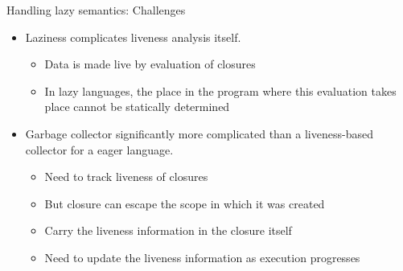 \documentclass[xcolor=x11names,compress,mathserif]{beamer}
\renewcommand{\(}{\begin{columns}}
\renewcommand{\)}{\end{columns}}
\newcommand{\<}[1]{\begin{column}{#1}}
\renewcommand{\>}{\end{column}}
\begin{document}

\begin{frame}{Handling lazy semantics: Challenges}
\normalsize
  \begin{itemize}[<+->]\itemsep2em
  \item Laziness complicates liveness analysis itself. 
    \begin{itemize}
    \item Data is made live by evaluation of closures
    \item In lazy languages, the place in the program
      where this evaluation takes place cannot be statically determined
    \end{itemize}
  \item Garbage collector significantly more complicated than a liveness-based
    collector for a eager language.
    \begin{itemize}
    \item Need to track liveness of closures
    \item But closure can escape the scope in which it was created
    \item Carry the liveness information in the closure itself
    \item Need to update the liveness information as execution progresses
    \end{itemize}
  \end{itemize}
\end{frame}
\end{document}
